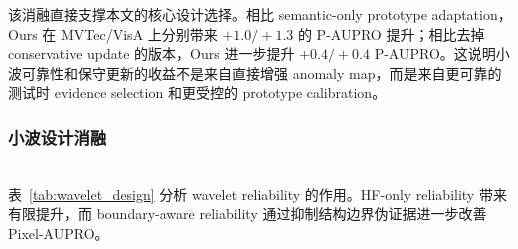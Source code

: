 \documentclass[runningheads]{llncs}
\begin{document}
\begin{table}[htbp]
  \centering
  \caption{MVTec 和 VisA 上的核心组件消融。每个单元格报告 (P-AUROC, P-AUPRO) / (I-AUROC, I-AP)。}
  \label{tab:core_ablation}
\end{table}

该消融直接支撑本文的核心设计选择。相比 semantic-only prototype adaptation，Ours 在 MVTec/VisA 上分别带来 $+1.0/+1.3$ 的 P-AUPRO 提升；相比去掉 conservative update 的版本，Ours 进一步提升 $+0.4/+0.4$ P-AUPRO。这说明小波可靠性和保守更新的收益不是来自直接增强 anomaly map，而是来自更可靠的测试时 evidence selection 和更受控的 prototype calibration。

\subsubsection{小波设计消融}
\mbox{}\\
\noindent
表~\ref{tab:wavelet_design} 分析 wavelet reliability 的作用。HF-only reliability 带来有限提升，而 boundary-aware reliability 通过抑制结构边界伪证据进一步改善 Pixel-AUPRO。
\end{document}
